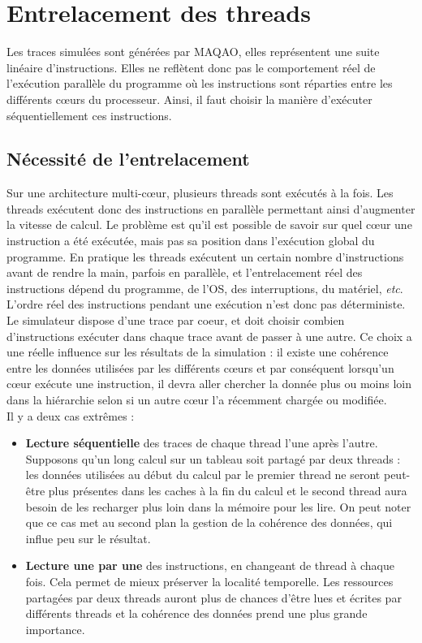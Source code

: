 \section{Entrelacement des threads}

Les traces simulées sont générées par \textsf{MAQAO}, elles représentent une suite linéaire d'instructions. Elles ne reflètent donc pas le comportement réel de l'exécution parallèle du programme où les instructions sont réparties entre les différents c\oe urs du processeur. Ainsi, il faut choisir la manière d'exécuter séquentiellement ces instructions.

\subsection{Nécessité de l'entrelacement}

Sur une architecture multi-c{\oe}ur, plusieurs threads sont exécutés à la fois. Les threads exécutent donc des instructions en parallèle permettant ainsi d'augmenter la vitesse de calcul. Le problème est qu'il est possible de savoir sur quel c\oe ur une instruction a été exécutée, mais pas sa position dans l'exécution global du programme. En pratique les threads exécutent un certain nombre d'instructions avant de rendre la main, parfois en parallèle, et l'entrelacement réel des instructions dépend du programme, de l'OS, des interruptions, du matériel, \emph{etc}. L'ordre réel des instructions pendant une exécution n'est donc pas déterministe.\\

Le simulateur dispose d'une trace par coeur, et doit choisir combien d'instructions exécuter dans chaque trace avant de passer à une autre. Ce choix a une réelle influence sur les résultats de la simulation : il existe une cohérence entre les données utilisées par les différents c\oe urs et par conséquent lorsqu'un c\oe ur exécute une instruction, il devra aller chercher la donnée plus ou moins loin dans la hiérarchie selon si un autre c\oe ur l'a récemment chargée ou modifiée. \\

Il y a deux cas extrêmes :

\begin{itemize}
  \item \textbf{Lecture séquentielle} des traces de chaque thread l'une après l'autre. Supposons qu'un long calcul sur un tableau soit partagé par deux threads : les données utilisées au début du calcul par le premier thread ne seront peut-être plus présentes dans les caches à la fin du calcul et le second thread aura besoin de les recharger plus loin dans la mémoire pour les lire. On peut noter que ce cas met au second plan la gestion de la cohérence des données, qui influe peu sur le résultat.
  \item \textbf{Lecture une par une} des instructions, en changeant de thread à chaque fois. Cela permet de mieux préserver la localité temporelle. Les ressources partagées par deux threads auront plus de chances d'être lues et écrites par différents threads et la cohérence des données prend une plus grande importance.
\end{itemize} 

